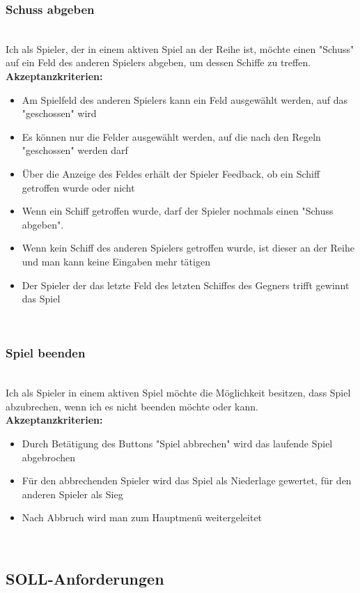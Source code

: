\documentclass[conference]{IEEEtran}
\begin{document}
    \subsubsection{Schuss abgeben}
    \ \\
    Ich als Spieler, der in einem aktiven Spiel an der Reihe ist, möchte einen "Schuss" auf ein Feld des anderen Spielers abgeben, um dessen Schiffe zu treffen. \\
    \textbf{Akzeptanzkriterien:}
    \begin{itemize}
        \item Am Spielfeld des anderen Spielers kann ein Feld ausgewählt werden, auf das "geschossen" wird
        \item Es können nur die Felder ausgewählt werden, auf die nach den Regeln "geschossen" werden darf
        \item Über die Anzeige des Feldes erhält der Spieler Feedback, ob ein Schiff getroffen wurde oder nicht
        \item Wenn ein Schiff getroffen wurde, darf der Spieler nochmals einen "Schuss abgeben".
        \item Wenn kein Schiff des anderen Spielers getroffen wurde, ist dieser an der Reihe und man kann keine Eingaben mehr tätigen
        \item Der Spieler der das letzte Feld des letzten Schiffes des Gegners trifft gewinnt das Spiel
    \end{itemize}
    \ \\
    \subsubsection{Spiel beenden}
    \ \\
    Ich als Spieler in einem aktiven Spiel möchte die Möglichkeit besitzen, dass Spiel abzubrechen, wenn ich es nicht beenden möchte oder kann. \\
    \textbf{Akzeptanzkriterien:}
    \begin{itemize}
        \item Durch Betätigung des Buttons "Spiel abbrechen" wird das laufende Spiel abgebrochen
        \item Für den abbrechenden Spieler wird das Spiel als Niederlage gewertet, für den anderen Spieler als Sieg
        \item Nach Abbruch wird man zum Hauptmenü weitergeleitet
    \end{itemize}
    \ \\
    \subsection{SOLL-Anforderungen}
    \ \\
\end{document}
